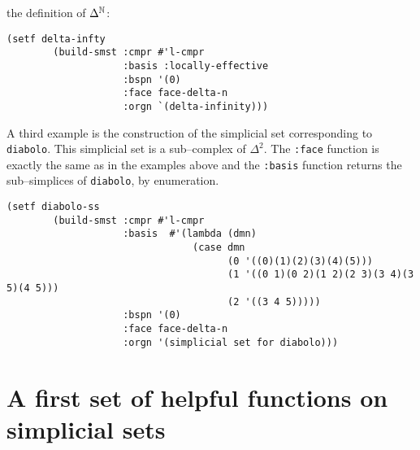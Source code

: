 the definition of $\Delta^{{\mathbb{N}}}$:
{\footnotesize\begin{verbatim}
(setf delta-infty
        (build-smst :cmpr #'l-cmpr
                    :basis :locally-effective
                    :bspn '(0)
                    :face face-delta-n
                    :orgn `(delta-infinity)))
\end{verbatim}}
\vskip 0.40cm
A third example is the construction of the simplicial set corresponding to  {\tt diabolo}. This
simplicial set is a  sub--complex of $\Delta^2$.
The {\tt :face} function is exactly the same as in the examples above and the {\tt :basis} function returns
the sub--simplices of {\tt diabolo}, by enumeration.
{\footnotesize \begin{verbatim}
(setf diabolo-ss
        (build-smst :cmpr #'l-cmpr
                    :basis  #'(lambda (dmn)
                                (case dmn
                                      (0 '((0)(1)(2)(3)(4)(5)))
                                      (1 '((0 1)(0 2)(1 2)(2 3)(3 4)(3 5)(4 5)))
                                      (2 '((3 4 5)))))
                    :bspn '(0)
                    :face face-delta-n
                    :orgn '(simplicial set for diabolo)))
\end{verbatim}}
\newpage

\section {A first set of helpful functions on simplicial sets}

